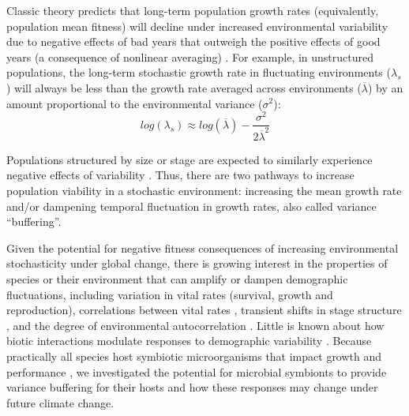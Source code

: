 \documentclass[12pt]{article}
\begin{document}
Classic theory predicts that long-term population growth rates (equivalently, population mean fitness) will decline under increased environmental variability due to negative effects of bad years that outweigh the positive effects of good years (a consequence of nonlinear averaging) \cite{lewontin_population_1969,tuljapurkar_population_1982}.
For example, in unstructured populations, the long-term stochastic growth rate in fluctuating environments ($\lambda_s$) will always be less than the growth rate averaged across environments ($\overline{\lambda}$) by an amount proportional to the environmental variance ($\sigma^2$): 
\begin{equation}
	 log(\lambda_s)  \approx log(\overline{\lambda}) - \frac{\sigma^2}{2\overline{\lambda}^2}
\end{equation}

Populations structured by size or stage are expected to similarly experience negative effects of variability \cite{cohen1979comparative,tuljapurkar2013population}.
Thus, there are two pathways to increase population viability in a stochastic environment: increasing the mean growth rate and/or dampening temporal fluctuation in growth rates, also called variance ``buffering''.

Given the potential for negative fitness consequences of increasing environmental stochasticity under global change, there is growing interest in the properties of species or their environment that can amplify or dampen demographic fluctuations, including variation in vital rates (survival, growth and reproduction)\cite{morris2008longevity}, correlations between vital rates \cite{compagnoni2016effect}, transient shifts in stage structure \cite{ellis2013role}, and the degree of environmental autocorrelation \cite{tuljapurkar1980population,fieberg2001stochastic}. 
Little is known about how biotic interactions modulate responses to demographic variability \cite{hilde_demographic_2020}. 
Because practically all species host symbiotic microorganisms that impact growth and performance \cite{rodriguez2009fungal,mcfall2013animals}, we investigated the potential for microbial symbionts to provide variance buffering for their hosts and how these responses may change under future climate change.
\end{document}
